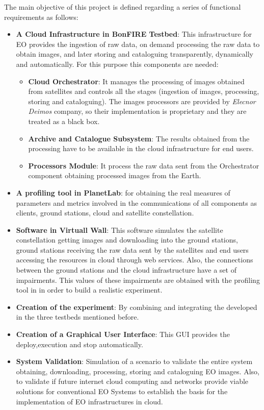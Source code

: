 The main objective of this project is defined regarding a series of functional
requirements as follows:
\begin{itemize}

\item {\textbf{A Cloud Infrastructure in BonFIRE Testbed}: This
  infrastructure for \ac{EO} provides the ingestion of raw data, on demand processing the raw
  data to obtain images, and later storing and cataloguing transparently,
  dynamically and automatically. For this purpose this components are needed:
}
\begin{itemize}

\item{\textbf{Cloud Orchestrator}: It manages the
  processing of images obtained from satellites and controls all the stages
  (ingestion of images, processing, storing and cataloguing). The images
  processors are provided by \emph{Elecnor Deimos} company, so their implementation is proprietary and they are treated as a black box.}
\item {\textbf{Archive and Catalogue Subsystem}: The
  results obtained from the processing have to be available in the cloud
  infrastructure for end users.}
\item{\textbf{Processors Module}: It process the raw data sent from
  the Orchestrator component obtaining processed images from the Earth.}
\end{itemize}
\item {\textbf{A profiling tool in PlanetLab}: for obtaining the real measures of
  parameters and metrics involved in the communications of all components as
  clients, ground stations, cloud and satellite constellation.}


\item {\textbf{Software in Virtuall Wall}: This software simulates the satellite
  constellation getting images and downloading into the ground stations, ground
  stations receiving the raw data sent by the satellites and end users
  accessing the resources in cloud through web services. Also, the connections
  between the ground stations and the cloud infrastructure have a set of
  impairments. This values of these impairments are obtained with the profiling tool in
  \pl in order to build a  realistic experiment.}

\item {\textbf{Creation of the experiment}: By combining and integrating
  the developed in the three testbeds mentioned before.}

\item {\textbf{Creation of a Graphical User Interface}: This \ac{GUI} provides
  the deploy,execution and stop automatically.}

\item {\textbf{System Validation}: Simulation of a scenario to validate the
  entire system obtaining, downloading, processing, storing and cataloguing
  \ac{EO} images. Also, to validate if future internet cloud computing
  and networks provide viable solutions for conventional \ac{EO}
  Systems to establish the basis for the implementation of \ac{EO}
  infrastructures in
  cloud. }

\end{itemize}

